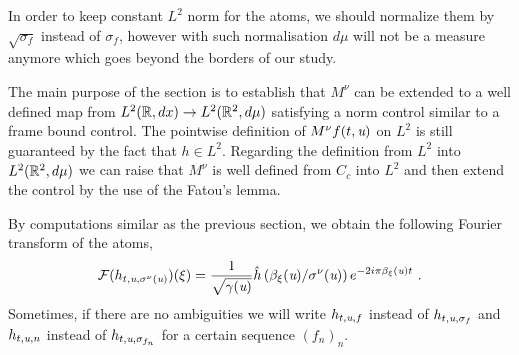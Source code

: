 \begin{remark}
In order to keep constant $L^2$ norm for the atoms, we should normalize them by $\sqrt{\sigma_f}$ instead of $\sigma_f$, however with such normalisation $d\mu$ will not be a measure anymore which goes beyond the borders of our study.
\end{remark}

The main purpose of the section is to establish that $M^\nu$ can be extended to a well defined map from $L^2(\mathbb{R},dx)\rightarrow L^2(\mathbb{R}^2,d\mu)$ satisfying a norm control similar to a frame bound control.  The pointwise definition of $M^\nu f(t,\textit{u})$ on $L^2$ is still guaranteed by the fact that $h\in L^2$. Regarding the definition from $L^2$ into $L^2(\mathbb{R}^2,d\mu)$ we can raise that $M^\nu$ is well defined from $C_c$ into $L^2$ and then extend the control by the use of the Fatou's lemma.

By computations similar as the previous section, we obtain the following Fourier transform of the atoms,
\begin{equation}
	\mathcal{F}(h_{t,\textit{u},\sigma^\nu(\textit{u})})(\xi) = \frac{1}{\sqrt{\gamma(\textit{u})}}\hat{h}\left( \beta_\xi(\textit{u})/\sigma^\nu(\textit{u}) \right)e^{-2i\pi\beta_\xi(\textit{u})t}\ .
\end{equation}
Sometimes, if there are no ambiguities we will write $h_{t,\textit{u},f}$ instead of $h_{t,\textit{u},\sigma_f}$ and $h_{t,\textit{u},n}$ instead of $h_{t,\textit{u},\sigma_{f_n}}$ for a certain sequence $(f_n)_n$.

